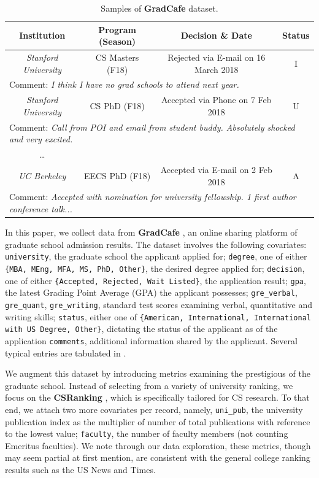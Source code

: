 \documentclass{article}
\newcommand{\noun}[1]{\textbf{#1}}
\newcommand{\var}[1]{\texttt{#1}}
\begin{document}
	\begin{table}[htpb]
	    \centering
	    \begin{tabular}{cccc}
		Institution & Program (Season) & Decision \& Date & Status \\\hline\hline
		\emph{Stanford University} & CS Masters (F18) & Rejected via E-mail on 16 March 2018 & I \\
		\multicolumn{4}{l}{Comment: \emph{I think I have no grad schools to attend next year.}}\\
		\emph{Stanford University} & CS PhD (F18) & Accepted via Phone on 7 Feb 2018 & U \\
		\multicolumn{4}{l}{Comment: \emph{Call from POI and email from student buddy. Absolutely shocked and very excited.}}\\
		\ldots\\
		\emph{UC Berkeley} & EECS PhD (F18) & Accepted via E-mail on 2 Feb 2018 & A \\
		\multicolumn{4}{l}{Comment: \emph{Accepted with nomination for university fellowship. 1 first author conference talk...}}\\ \hline\hline
	    \end{tabular}
	    \caption{Samples of \noun{GradCafe} dataset.}
	    \label{table:data_sample}
	\end{table}
	In this paper, we collect data from \noun{GradCafe} \cite{GradCafe}, an online
	sharing platform of graduate school admission results. The dataset
	involves the following covariates:
	\var{university}, the graduate school the applicant applied for;
	\var{degree}, one of either \var{\{MBA, MEng, MFA, MS, PhD, Other\}}, the desired degree applied for;
	\var{decision}, one of either \var{\{Accepted, Rejected, Wait Listed\}}, the application result;
	\var{gpa}, the latest Grading Point Average (GPA) the applicant possesses;
	\var{gre\_verbal}, \var{gre\_quant}, \var{gre\_writing}, standard test scores examining verbal, quantitative and writing skills;
	\var{status}, either one of \var{\{American, International, International with US Degree,
	Other\}}, dictating the status of the applicant as of the application
	\var{comments}, additional information shared by the applicant. Several
	typical entries are tabulated in .

	We augment this dataset by introducing metrics examining the prestigious of the graduate
	school. Instead of selecting from a variety of university ranking, we focus on the \noun{CSRanking} \cite{CSR},
	which is specifically tailored for CS research. To that end, we attach two more covariates per record,
	namely,
	\var{uni\_pub}, the university publication index as the multiplier of number of total publications with reference
	to the lowest value;
	\var{faculty}, the number of faculty members (not counting Emeritus faculties).
	We note through our data exploration, these metrics, though may seem partial at first mention,
	are consistent with the general college ranking results such as
	the US News and Times.
\end{document}
